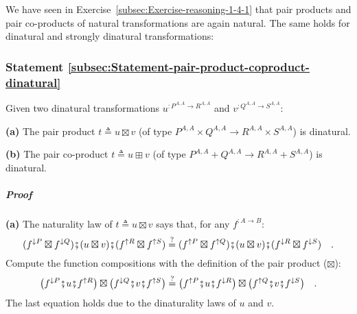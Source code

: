 We have seen in Exercise~\ref{subsec:Exercise-reasoning-1-4-1} that
pair products and pair co-products of natural transformations are
again natural. The same holds for dinatural and strongly dinatural
transformations:

\subsubsection{Statement \label{subsec:Statement-pair-product-coproduct-dinatural}\ref{subsec:Statement-pair-product-coproduct-dinatural}}

Given two dinatural transformations $u^{:P^{A,A}\rightarrow R^{A,A}}$
and $v^{:Q^{A,A}\rightarrow S^{A,A}}$:

\textbf{(a)} The pair product $t\triangleq u\boxtimes v$ (of type
$P^{A,A}\times Q^{A,A}\rightarrow R^{A,A}\times S^{A,A}$) is dinatural.

\textbf{(b)} The pair co-product
$t\triangleq u\boxplus v$ (of type $P^{A,A}+Q^{A,A}\rightarrow R^{A,A}+S^{A,A}$)
is dinatural.

\subparagraph{Proof}

\textbf{(a)} The naturality law of $t\triangleq u\boxtimes v$ says
that, for any $f^{:A\rightarrow B}$:
\[
(f^{\downarrow P}\boxtimes f^{\downarrow Q})\bef(u\boxtimes v)\bef(f^{\uparrow R}\boxtimes f^{\uparrow S})\overset{?}{=}(f^{\uparrow P}\boxtimes f^{\uparrow Q})\bef(u\boxtimes v)\bef(f^{\downarrow R}\boxtimes f^{\downarrow S})\quad.
\]
Compute the function compositions with the definition of the pair
product ($\boxtimes$):
\[
\big(f^{\downarrow P}\bef u\bef f^{\uparrow R}\big)\boxtimes\big(f^{\downarrow Q}\bef v\bef f^{\uparrow S}\big)\overset{?}{=}\big(f^{\uparrow P}\bef u\bef f^{\downarrow R}\big)\boxtimes\big(f^{\uparrow Q}\bef v\bef f^{\downarrow S}\big)\quad.
\]
The last equation holds due to the dinaturality laws of $u$ and $v$.

